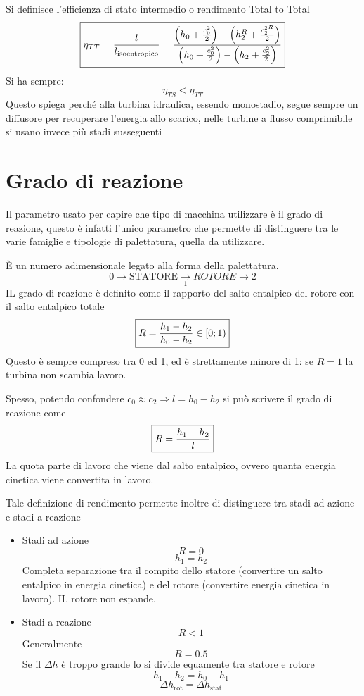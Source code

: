 \documentclass[a4paper, 15pt]{article}
\begin{document}
\begin{adjustwidth}{2in}{}
	Si definisce l'efficienza di stato intermedio o rendimento Total to Total
	\begin{equation}{\label{eq:10}}
		\boxed{\eta_{TT} = {l\over l_{\text{isoentropico}}} = \dfrac{\left(h_0 + {c_0^2\over2}\right) - \left(h^R_2+{{c_2^2}^R\over2}\right)}{\left(h_0 + {c_0^2\over2}\right) - \left(h_2 + {c_2^2\over2}\right)}}
	\end{equation}
	Si ha sempre:
	\[\eta_{TS}<\eta_{TT}\]
	Questo spiega perché alla turbina idraulica, essendo monostadio, segue sempre un diffusore per recuperare l'energia allo scarico, nelle turbine a flusso comprimibile si usano invece più stadi susseguenti
\end{adjustwidth}



\section{Grado di reazione}
\begin{adjustwidth}{2in}{}
	Il parametro usato per capire che tipo di macchina utilizzare è il grado di reazione, questo è infatti l'unico parametro che permette di distinguere tra le varie famiglie e tipologie di palettatura, quella da utilizzare. 
	
	È un numero adimensionale legato alla forma della palettatura. 
	\[0\rightarrow\boxed{\text{STATORE}}\underset{1}{\rightarrow}\boxed{ROTORE}\rightarrow2\]
	IL grado di reazione è definito come il rapporto del salto entalpico del rotore con il salto entalpico totale
	\begin{equation}{\label{eq:11}}
		\boxed{R = \dfrac{h_1-h_2}{h_0-h_2} \in [0;1)}
	\end{equation}
	Questo è sempre compreso tra 0 ed 1, ed è strettamente minore di 1: se $R=1$ la turbina non scambia lavoro. \newline 
	
	Spesso, potendo confondere $c_0\approx c_2\Rightarrow l = h_0-h_2$ si può scrivere il grado di reazione come
	\begin{equation}{\label{eq:12}}
		\boxed{R = \dfrac{h_1-h_2}{l}}
	\end{equation}
	La quota parte di lavoro che viene dal salto entalpico, ovvero quanta energia cinetica viene convertita in lavoro. \newline
	
	Tale definizione di rendimento permette inoltre di distinguere tra stadi ad azione e stadi a reazione 
	\begin{itemize}
		\item Stadi ad azione
		\[R=0\]
		\[h_1=h_2\]
		Completa separazione tra il compito dello statore (convertire un salto entalpico in energia cinetica) e del rotore (convertire energia cinetica in lavoro). IL rotore non espande.
		\item Stadi a reazione 
		\[R<1\]
		Generalmente 
		\[R=0.5\]
		Se il $\Delta h$ è troppo grande lo si divide equamente tra statore e rotore
		\[h_1-h_2 = h_0-h_1\]
		\[\Delta h_{\text{rot}} = \Delta h_\text{stat}\]
	\end{itemize}		
\end{adjustwidth}
\end{document}
